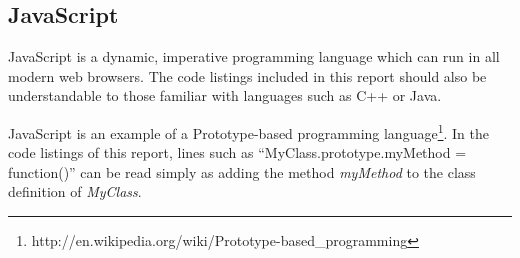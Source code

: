 \subsection{JavaScript}
JavaScript is a dynamic, imperative programming language which can run in all modern web browsers. The code listings included in this report should also be understandable to those familiar with languages such as C++ or Java.

JavaScript is an example of a Prototype-based programming language\footnote{http://en.wikipedia.org/wiki/Prototype-based\_programming}. In the code listings of this report, lines such as ``MyClass.prototype.myMethod = function()'' can be read simply as adding the method \textit{myMethod} to the class definition of \textit{MyClass}.